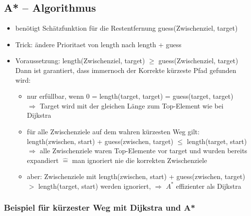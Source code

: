 \documentclass[11pt, fleqn]{scrreprt}
\begin{document}
        \subsection*{A* – Algorithmus}
        \begin{itemize}
            \item benötigt Schätzfunktion für die Restentfernung guess(Zwischenziel, target)
            \item Trick: ändere Prioritaet von length nach length + guess
            \item Voraussetzung: length(Zwischenziel, target) $\geq$ guess(Zwischenziel, target)\\
            Dann ist garantiert, dass immernoch der Korrekte kürzeste Pfad gefunden wird:
            \begin{itemize}
                \item nur erfüllbar, wenn 0 = length(target, target) = guess(target, target)\\
                $\Rightarrow$ Target wird mit der gleichen Länge zum Top-Element wie bei Dijkstra
                \item für alle Zwischenziele auf dem wahren kürzesten Weg gilt:\\ \hspace*{0.5cm} length(zwischen, start) + guess(zwischen, target) $\leq$ length(target, start)\\
                $\Rightarrow$ alle Zwischenziele waren Top-Elemente vor target und wurden bereits expandiert $\widehat{=}$ man ignoriert nie die korrekten Zwischenziele
                \item aber: Zwischenziele mit length(zwischen, start) + guess(zwischen, target) $>$ length(target, start) werden ignoriert, $\Rightarrow$ $A^*$ effizienter als Dijkstra
            \end{itemize}
        \end{itemize}

    \subsubsection*{Beispiel für kürzester Weg mit Dijkstra und A*}
\end{document}
